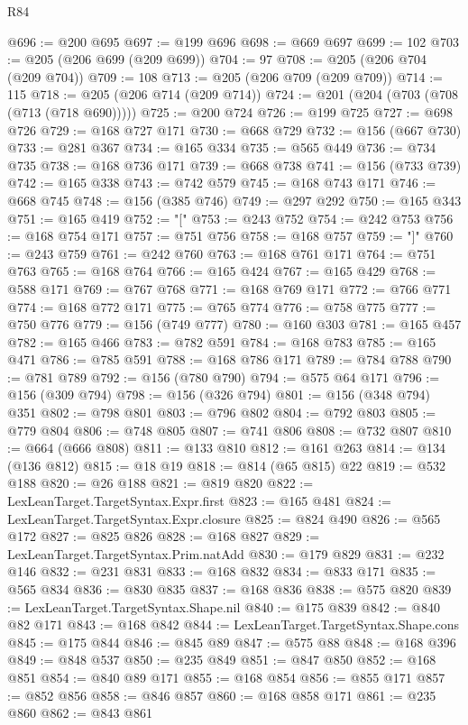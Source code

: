 \begin{lexlean}{R84}
\begin{coremodule}
@696 := @200 @695
@697 := @199 @696
@698 := @669 @697
@699 := 102
@703 := @205 (@206 @699 (@209 @699))
@704 := 97
@708 := @205 (@206 @704 (@209 @704))
@709 := 108
@713 := @205 (@206 @709 (@209 @709))
@714 := 115
@718 := @205 (@206 @714 (@209 @714))
@724 := @201 (@204 (@703 (@708 (@713 (@718 @690)))))
@725 := @200 @724
@726 := @199 @725
@727 := @698 @726
@729 := @168 @727 @171
@730 := @668 @729
@732 := @156 (@667 @730)
@733 := @281 @367
@734 := @165 @334
@735 := @565 @449
@736 := @734 @735
@738 := @168 @736 @171
@739 := @668 @738
@741 := @156 (@733 @739)
@742 := @165 @338
@743 := @742 @579
@745 := @168 @743 @171
@746 := @668 @745
@748 := @156 (@385 @746)
@749 := @297 @292
@750 := @165 @343
@751 := @165 @419
@752 := "["
@753 := @243 @752
@754 := @242 @753
@756 := @168 @754 @171
@757 := @751 @756
@758 := @168 @757
@759 := "]"
@760 := @243 @759
@761 := @242 @760
@763 := @168 @761 @171
@764 := @751 @763
@765 := @168 @764
@766 := @165 @424
@767 := @165 @429
@768 := @588 @171
@769 := @767 @768
@771 := @168 @769 @171
@772 := @766 @771
@774 := @168 @772 @171
@775 := @765 @774
@776 := @758 @775
@777 := @750 @776
@779 := @156 (@749 @777)
@780 := @160 @303
@781 := @165 @457
@782 := @165 @466
@783 := @782 @591
@784 := @168 @783
@785 := @165 @471
@786 := @785 @591
@788 := @168 @786 @171
@789 := @784 @788
@790 := @781 @789
@792 := @156 (@780 @790)
@794 := @575 @64 @171
@796 := @156 (@309 @794)
@798 := @156 (@326 @794)
@801 := @156 (@348 @794) @351
@802 := @798 @801
@803 := @796 @802
@804 := @792 @803
@805 := @779 @804
@806 := @748 @805
@807 := @741 @806
@808 := @732 @807
@810 := @664 (@666 @808)
@811 := @133 @810
@812 := @161 @263
@814 := @134 (@136 @812)
@815 := @18 @19
@818 := @814 (@65 @815) @22
@819 := @532 @188
@820 := @26 @188
@821 := @819 @820
@822 := LexLeanTarget.TargetSyntax.Expr.first
@823 := @165 @481
@824 := LexLeanTarget.TargetSyntax.Expr.closure
@825 := @824 @490
@826 := @565 @172
@827 := @825 @826
@828 := @168 @827
@829 := LexLeanTarget.TargetSyntax.Prim.natAdd
@830 := @179 @829
@831 := @232 @146
@832 := @231 @831
@833 := @168 @832
@834 := @833 @171
@835 := @565 @834
@836 := @830 @835
@837 := @168 @836
@838 := @575 @820
@839 := LexLeanTarget.TargetSyntax.Shape.nil
@840 := @175 @839
@842 := @840 @82 @171
@843 := @168 @842
@844 := LexLeanTarget.TargetSyntax.Shape.cons
@845 := @175 @844
@846 := @845 @89
@847 := @575 @88
@848 := @168 @396
@849 := @848 @537
@850 := @235 @849
@851 := @847 @850
@852 := @168 @851
@854 := @840 @89 @171
@855 := @168 @854
@856 := @855 @171
@857 := @852 @856
@858 := @846 @857
@860 := @168 @858 @171
@861 := @235 @860
@862 := @843 @861

\end{coremodule}
\end{lexlean}

